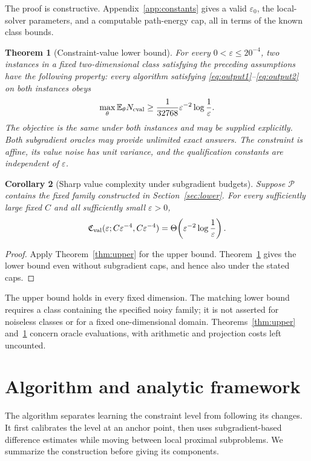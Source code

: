 \documentclass[11pt,a4paper]{article}
\newcommand{\E}{\mathbb E}
\newcommand{\eps}{\varepsilon}
\newtheorem{theorem}{Theorem}[section]
\newtheorem{corollary}[theorem]{Corollary}
\theoremstyle{remark}
\numberwithin{equation}{section}
\begin{document}
The proof is constructive. Appendix~\ref{app:constants} gives a valid $\eps_0$, the local-solver parameters, and a computable path-energy cap, all in terms of the known class bounds.

\begin{theorem}[Constraint-value lower bound]\label{thm:mainlower}
For every $0<\eps\le20^{-4}$, two instances in a fixed two-dimensional class satisfying the preceding assumptions have the following property: every algorithm satisfying \eqref{eq:output1}--\eqref{eq:output2} on both instances obeys
\begin{equation}
 \max_{\theta}\E_\theta N_{\rm cval}
 \ge\frac1{32768}\eps^{-2}\log\frac1\eps.
 \label{eq:mainlower}
\end{equation}
The objective is the same under both instances and may be supplied explicitly. Both subgradient oracles may provide unlimited exact answers. The constraint is affine, its value noise has unit variance, and the qualification constants are independent of $\eps$.
\end{theorem}

\begin{corollary}[Sharp value complexity under subgradient budgets]\label{cor:matching}
Suppose $\mathcal P$ contains the fixed family constructed in Section~\ref{sec:lower}. For every sufficiently large fixed $C$ and all sufficiently small $\eps>0$,
\[
 \mathfrak C_{\rm val}(\eps;C\eps^{-4},C\eps^{-4})
 =\Theta\!\left(\eps^{-2}\log\frac1\eps\right).
\]
\end{corollary}
\begin{proof}
Apply Theorem~\ref{thm:upper} for the upper bound. Theorem~\ref{thm:mainlower} gives the lower bound even without subgradient caps, and hence also under the stated caps.
\end{proof}

The upper bound holds in every fixed dimension. The matching lower bound requires a class containing the specified noisy family; it is not asserted for noiseless classes or for a fixed one-dimensional domain. Theorems~\ref{thm:upper} and~\ref{thm:mainlower} concern oracle evaluations, with arithmetic and projection costs left uncounted.

\section{Algorithm and analytic framework}\label{sec:algorithm}
The algorithm separates learning the constraint level from following its changes. It first calibrates the level at an anchor point, then uses subgradient-based difference estimates while moving between local proximal subproblems. We summarize the construction before giving its components.
\end{document}
